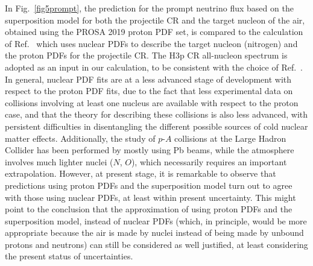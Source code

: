 In Fig.~\ref{fig5prompt}, the prediction for the prompt neutrino flux based on the superposition model for both the projectile 
CR and the target nucleon of the air, obtained using the PROSA 2019 proton PDF set, is compared to the calculation of Ref.~\cite{Bhattacharya:2016jce} which uses nuclear PDFs to describe the target nucleon (nitrogen) and the proton PDFs for the projectile CR. The H3p CR all-nucleon spectrum is adopted as an input in our calculation, to be consistent with the choice of Ref.~\cite{Bhattacharya:2016jce}. In general, nuclear PDF fits are at a less advanced stage of development with respect to the proton PDF fits, due to the fact that less experimental data on collisions involving at least one nucleus are available with respect to the proton case, and that the theory for describing these collisions is also less advanced, with persistent difficulties in disentangling the different possible sources of cold nuclear matter effects. Additionally, the study of $p$-$A$ collisions at the Large Hadron Collider has been performed by mostly using Pb beams, while the atmosphere involves much lighter nuclei ($N$, $O$), which necessarily requires an important extrapolation.    
However, at present stage, it is remarkable to observe that predictions using proton PDFs and the superposition model turn out to agree with those using nuclear PDFs, at least within present uncertainty. 
This might point to the conclusion that 
the approximation of using proton PDFs and the superposition model, instead of nuclear PDFs (which, in principle, would be more appropriate because the air is made by nuclei instead of being made by unbound protons and neutrons) can still be considered as well justified, at least considering the present status of uncertainties. 
     

